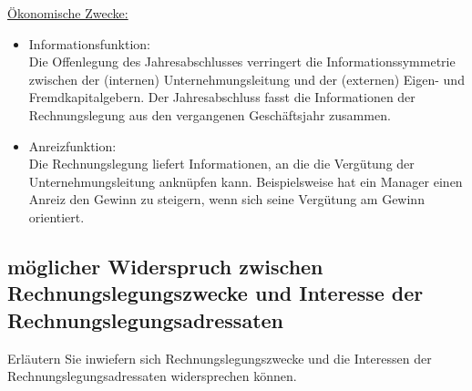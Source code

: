 \documentclass[paper=a4, fontsize=11pt]{scrartcl}
\numberwithin{equation}{section}
\numberwithin{figure}{section}
\numberwithin{table}{section}
\begin{document}
\underline{Ökonomische Zwecke:}

\begin{itemize}
\item Informationsfunktion: \\
Die Offenlegung des Jahresabschlusses verringert die Informationssymmetrie zwischen der (internen) Unternehmungsleitung und der (externen) Eigen- und Fremdkapitalgebern. Der Jahresabschluss fasst die Informationen der Rechnungslegung aus den vergangenen Geschäftsjahr zusammen.

\item Anreizfunktion: \\
Die Rechnungslegung liefert Informationen, an die die Vergütung der Unternehmungsleitung anknüpfen kann. Beispielsweise hat ein Manager einen Anreiz den Gewinn zu steigern, wenn sich seine Vergütung am Gewinn orientiert.
\end{itemize}
\subsection{möglicher Widerspruch zwischen Rechnungslegungszwecke und Interesse der Rechnungslegungsadressaten}
Erläutern Sie inwiefern sich Rechnungslegungszwecke und die Interessen der Rechnungslegungsadressaten widersprechen können. \\
\end{document}
